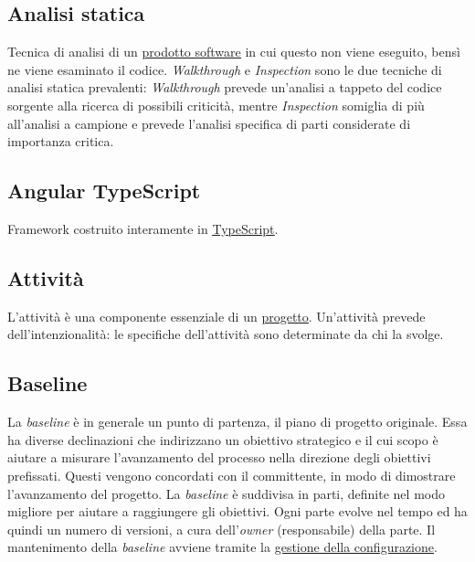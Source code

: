 	\subsection{Analisi statica}
	\label{sec:analisistatica}
	Tecnica di analisi di un \underline{\hyperref[sec:prodottosoftware]{prodotto software}} in cui questo non viene eseguito, bensì ne viene esaminato il codice.
	\emph{Walkthrough} e \emph{Inspection} sono le due tecniche di analisi statica prevalenti: \emph{Walkthrough} prevede un'analisi a tappeto del codice sorgente alla ricerca di possibili criticità, mentre \emph{Inspection} somiglia di più all'analisi a campione e prevede l'analisi specifica di parti considerate di importanza critica.
	
	
	\subsection{Angular TypeScript}
	\label{sec:angulartypescript}
	Framework costruito interamente in \underline{\hyperref[sec:typescript]{TypeScript}}.
	
	\subsection{Attività}
	\label{sec:attivita}
	L'attività è una componente essenziale di un \underline{\hyperref[sec:progetto]{progetto}}. Un'attività prevede dell'intenzionalità: le specifiche dell'attività sono determinate da chi la svolge.

	\newpage
	
	\subsection{Baseline}
	\label{sec:baseline}
	La \emph{baseline} è in generale un punto di partenza, il piano di progetto originale. Essa ha diverse declinazioni che indirizzano un obiettivo strategico e il cui scopo è aiutare a misurare l'avanzamento del processo nella direzione degli obiettivi prefissati. Questi vengono concordati con il committente, in modo di dimostrare l'avanzamento del progetto. La  \emph{baseline} è suddivisa in parti, definite nel modo migliore per aiutare a raggiungere gli obiettivi. Ogni parte evolve nel tempo ed ha quindi un numero di versioni, a cura dell'\emph{owner} (responsabile) della parte. Il mantenimento della  \emph{baseline} avviene tramite la \underline{\hyperref[sec:controlloconfigurazione]{gestione della configurazione}}.

